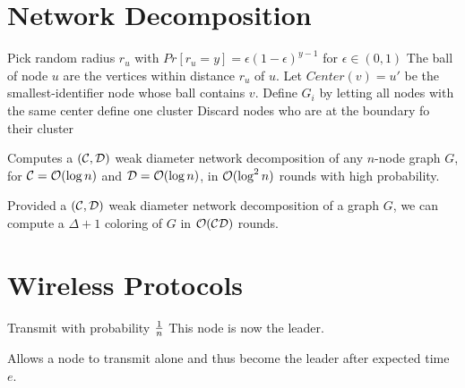 \documentclass[11pt, oneside]{book}   						%
\begin{document}
\section{Network Decomposition}
\textbf{}
\begin{algorithm}
\caption{}\label{weakdecomp}
\begin{algorithmic}[1]
	\ForEach[node $u$]
		\State Pick random radius $r_u$ with $Pr[r_u=y] = \epsilon(1-\epsilon)^{y-1}$ for $\epsilon\in (0,1)$
		\State The ball of node $u$ are the vertices within distance $r_u$ of $u$. 
	\EndForEach
	\ForEach[node $v$]
		\State Let $Center(v) = u'$ be the smallest-identifier node whose ball contains $v$.
	\EndForEach
	\State Define $G_i$ by letting all nodes with the same center define one cluster
	\State Discard nodes who are at the boundary fo their cluster
\EndFor
\end{algorithmic}
\end{algorithm}
\begin{mythm} Computes a $(\mathcal{C}, \mathcal{D})$ weak diameter network decomposition of any $n$-node graph $G$, for $\mathcal{C}=\mathcal{O}(\log n)$ and $\mathcal{D} = \mathcal{O}(\log n)$, in $\mathcal{O}(\log^2 n)$ rounds with high probability.\end{mythm}
\begin{mythm}Provided a $(\mathcal{C}, \mathcal{D})$ weak diameter network decomposition of a graph $G$, we can compute a $\Delta+1$ coloring of $G$ in $\mathcal{O}(\mathcal{C}\mathcal{D})$ rounds.\end{mythm}

\section{Wireless Protocols}
\textbf{}
\begin{algorithm}
\caption{}\label{aloha}
\begin{algorithmic}[1]
\ForEach[node $v$] 
	\Repeat
		\State Transmit with probability $\frac{1}{n}$
\EndForEach
\State This node is now the leader.
\end{algorithmic}
\end{algorithm}
\begin{mythm} Allows a node to transmit alone and thus become the leader after expected time $e$.\end{mythm}
\end{document}
